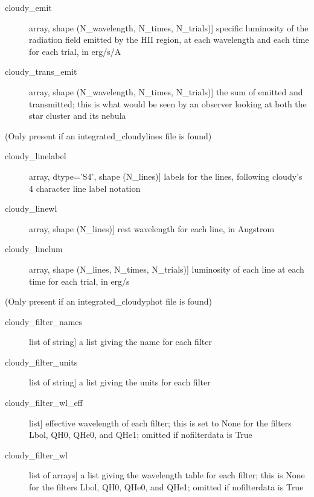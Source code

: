 \documentclass[letterpaper,10pt,english]{sphinxmanual}
\begin{document}
\begin{fulllineitems}
\begin{description}
\begin{description}
\item[{cloudy\_emit}] \leavevmode{[}array, shape (N\_wavelength, N\_times, N\_trials){]}
specific luminosity of the radiation field emitted by the HII
region, at each wavelength and each time for each trial, in
erg/s/A

\item[{cloudy\_trans\_emit}] \leavevmode{[}array, shape (N\_wavelength, N\_times, N\_trials){]}
the sum of emitted and transmitted; this is what would be seen
by an observer looking at both the star cluster and its nebula

\end{description}

(Only present if an integrated\_cloudylines file is found)
\begin{description}
\item[{cloudy\_linelabel}] \leavevmode{[}array, dtype='S4', shape (N\_lines){]}
labels for the lines, following cloudy's 4 character line label
notation

\item[{cloudy\_linewl}] \leavevmode{[}array, shape (N\_lines){]}
rest wavelength for each line, in Angstrom

\item[{cloudy\_linelum}] \leavevmode{[}array, shape (N\_lines, N\_times, N\_trials){]}
luminosity of each line at each time for each trial, in erg/s

\end{description}

(Only present if an integrated\_cloudyphot file is found)
\begin{description}
\item[{cloudy\_filter\_names}] \leavevmode{[}list of string{]}
a list giving the name for each filter

\item[{cloudy\_filter\_units}] \leavevmode{[}list of string{]}
a list giving the units for each filter

\item[{cloudy\_filter\_wl\_eff}] \leavevmode{[}list{]}
effective wavelength of each filter; this is set to None for the
filters Lbol, QH0, QHe0, and QHe1; omitted if nofilterdata is
True

\item[{cloudy\_filter\_wl}] \leavevmode{[}list of arrays{]}
a list giving the wavelength table for each filter; this is
None for the filters Lbol, QH0, QHe0, and QHe1; omitted if
nofilterdata is True


\end{description}
\end{description}
\end{fulllineitems}
\end{document}
